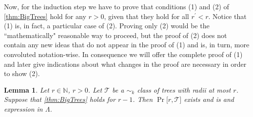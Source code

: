 \documentclass[12pt,notitlepage,a4paper]{article}
\newtheorem{lemma}{Lemma}[section]
\theoremstyle{definition}
\newcommand{\N}{\mathbb{N}}
\begin{document}
Now, for the induction step we have to prove that 
conditions (1) and (2) of \cref{thm:BigTrees} hold
for any $r>0$, given that they hold for all
$r^\prime < r$. Notice that (1) is, in fact, a particular
case of (2). Proving only (2) would be the ``mathematically"
reasonable way to proceed, but the proof of (2) does not contain
any new ideas that do not appear in the proof of (1) and is, in turn,
more convoluted notation-wise. In consequence we will offer the complete 
proof of (1) and later give indications about what changes in the proof
are necessary in order to show (2). 
	
	\begin{lemma}
	Let $r\in \N$, $r>0$. Let $\mathcal{T}$ be a 
	$\sim_k$ class of trees with radii at most $r$.
	Suppose that \cref{thm:BigTrees} holds
	for $r-1$. Then $\Pr\big[r, \mathcal{T}\big]$ 
	exists and is and expression in $\Lambda$.   
	\end{lemma}
\end{document}
